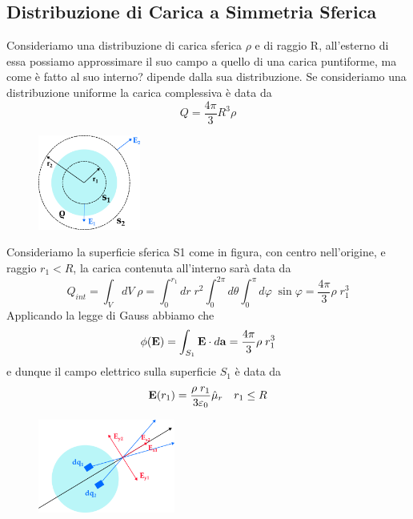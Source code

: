 \subsection{Distribuzione di Carica a Simmetria Sferica}

Consideriamo una distribuzione di carica sferica $\rho$ e di raggio R, all'esterno di essa possiamo approssimare il suo campo a quello di una carica puntiforme, ma come \`e fatto al suo interno? dipende dalla sua distribuzione. Se consideriamo una distribuzione uniforme la carica complessiva \`e data da 
\begin{equation*}
	Q = \frac{4 \pi}{3}R^3 \rho
\end{equation*} 

\begin{figure}  %
    \centering
    \includegraphics[width=0.3\textwidth]{images/spheric}  %
\end{figure}

\noindent Consideriamo la superficie sferica S1 come in figura, con centro nell'origine, e raggio $r_1 < R$, la carica contenuta all'interno sar\`a data da 
\begin{equation*}
	Q_{int} = \int_{V}dV\; \rho = \int_{0}^{r_1}dr \; r^2 \int_{0}^{2\pi}d \theta \int_{0}^{\pi}d\varphi \; \sin \varphi = \frac{4 \pi}{3}\rho \; r_1^3 
\end{equation*}
Applicando la legge di Gauss abbiamo che 
\begin{equation*}
\phi(\bold{E}) = \int_{S_1} \bold{E} \cdot d\bold{a}  =	\frac{4 \pi}{3}\rho \; r_1^3 
\end{equation*}
e dunque il campo elettrico sulla superficie $S_1$ \`e data da
\begin{equation*}
	\bold{E}(r_1) = \frac{\rho \; r_1}{3 \varepsilon_0} \hat{\mu}_{r} \quad r_1 \leq R
\end{equation*}

\begin{figure}  %
    \centering
    \includegraphics[width=0.4\textwidth]{images/sym}  %
\end{figure}

